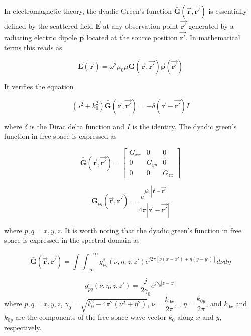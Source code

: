 \documentclass{article}
\begin{document}
In electromagnetic theory, the dyadic Green's function $\bar{\bar{\textbf{G}}}(\vec{\textbf{r}},\vec{\textbf{r}'})$ is essentially defined by the scattered
field  $\vec{\textbf{E}}$ at any observation point $\vec{\textbf{r}'}$ generated by a radiating electric dipole $\vec{\textbf{p}}$ located at the source position $\vec{\textbf{r}'}$. In mathematical terms this reads as 

\begin{equation}
\label{EQ_Green1}
\vec{\textbf{E}}(\vec{\textbf{r}})= \omega^2 \mu_0 \mu \bar{\bar{\textbf{G}}}(\vec{\textbf{r}},\vec{\textbf{r}'}) \vec{\textbf{p}} (\vec{\textbf{r}'})
\end{equation}

It verifies the equation 

\begin{equation}
\label{EQ_Green2}
(\mathcal{r}^2 + k_0^2) \bar{\bar{\textbf{G}}}(\vec{\textbf{r}},\vec{\textbf{r}'})  = - \delta (\vec{\textbf{r}}-\vec{\textbf{r}'}) \underline{I}
\end{equation}

where $\delta$ is the Dirac delta function and $\underline{I}$ is the identity. The dyadic green's function in free space is expressed as 

\begin{equation}
\label{EQ_Green3a}
\bar{\bar{\textbf{G}}}(\vec{\textbf{r}},\vec{\textbf{r}'}) = 
\begin{bmatrix}
G_{xx} & 0 & 0\\
0 & G_{yy} & 0\\
0 & 0 & G_{zz}
\end{bmatrix}
\end{equation}

\begin{equation}
\label{EQ_Green3b}
\textbf{G}_{pq}(\vec{\textbf{r}},\vec{\textbf{r}'}) = \dfrac{e^{jk_0|\vec{\textbf{r}}-\vec{\textbf{r}'}|}}{4\pi|\vec{\textbf{r}}-\vec{\textbf{r}'}|}
\end{equation}

where $p,q = x,y,z$. It is worth noting that the dyadic green's function in free space is expressed in the spectral domain as  

\begin{equation}
\label{EQ_Green4a}
\bar{\bar{\textbf{G}}}(\vec{\textbf{r}},\vec{\textbf{r}'}) = \int\int_{-\infty}^{+\infty} g^s_{pq}(\nu,\eta,z,z')e^{j2\pi[\nu(x-x')+\eta(y-y')]}d\nu d\eta
\end{equation}

\begin{equation}
\label{EQ_Green4b}
g^s_{pq}(\nu,\eta,z,z') = \dfrac{j}{2\gamma_0}e^{j\gamma_0|z-z'|}
\end{equation}
where $p,q = x,y,z$,  $\gamma_0 = \sqrt{k_0^2-4\pi^2(\nu^2+\eta^2)}$, $\nu=\dfrac{k_{0x}}{2\pi}$, , $\eta=\dfrac{k_{0y}}{2\pi}$, and $k_{0x}$ and $k_{0y}$ are the components of the free space wave vector $k_0$ along $x$ and $y$, respectively. 
\end{document}
